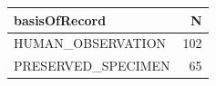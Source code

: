 \documentclass[]{book}
\newenvironment{Shaded}{\begin{snugshade}}{\end{snugshade}}
\newcommand{\DataTypeTok}[1]{\textcolor[rgb]{0.13,0.29,0.53}{#1}}
\newcommand{\KeywordTok}[1]{\textcolor[rgb]{0.13,0.29,0.53}{\textbf{#1}}}
\newcommand{\NormalTok}[1]{#1}
\newcommand{\OperatorTok}[1]{\textcolor[rgb]{0.81,0.36,0.00}{\textbf{#1}}}
\newcommand{\StringTok}[1]{\textcolor[rgb]{0.31,0.60,0.02}{#1}}
\begin{document}
\begin{Shaded}
\end{Shaded}

\begin{tabular}{l|r}
\hline
basisOfRecord & N\\
\hline
HUMAN\_OBSERVATION & 102\\
\hline
PRESERVED\_SPECIMEN & 65\\
\hline
\end{tabular}


\end{document}
